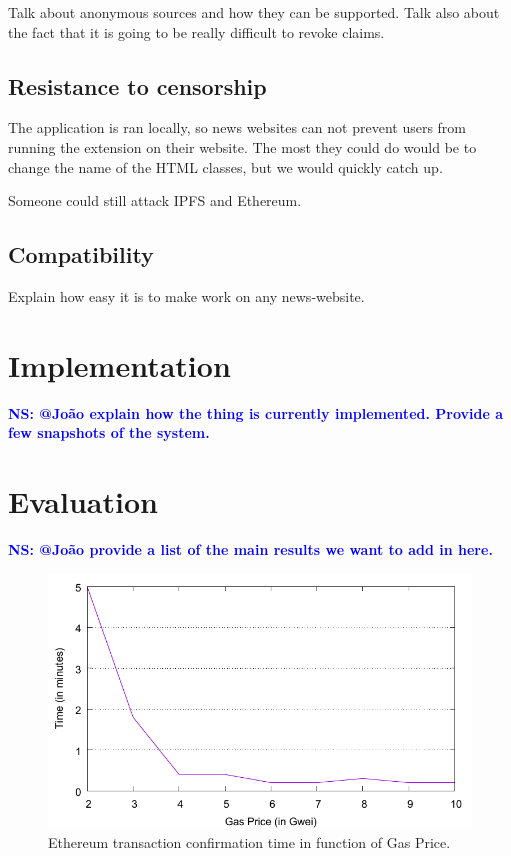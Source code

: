 \documentclass[letterpaper,twocolumn,10pt]{article}
\newcommand{\note}[1]{\textcolor{blue}{\bf #1}}
\begin{document}
Talk about anonymous sources and how they can be supported. Talk also about the fact that it is going to be really difficult to revoke claims.

\subsection{Resistance to censorship}
The application is ran locally, so news websites can not prevent users from running the extension on their website. The most they could do would be to change the name of the HTML classes, but we would quickly catch up.

Someone could still attack IPFS and Ethereum.

\subsection{Compatibility}
Explain how easy it is to make work on any news-website.

\section{Implementation}

\note{NS: @João explain how the thing is currently implemented. Provide a few snapshots of the system.}


\section{Evaluation}

\note{NS: @João provide a list of the main results we want to add in here.}

\begin{figure}[t]
  \centering 
  \includegraphics[width=\columnwidth]{final-figures/ethereum-confirmation-time.pdf}
  \vspace{-10pt}
  \caption{Ethereum transaction confirmation time in function of Gas Price.}
  \label{fig:confirmationtime}
\end{figure}
\end{document}
